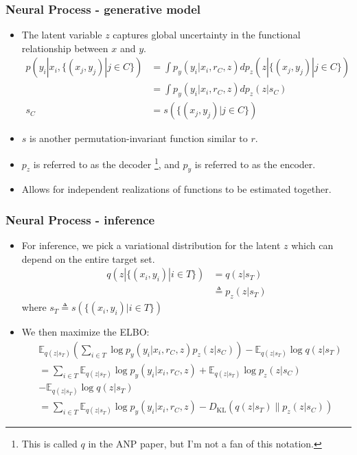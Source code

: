 \documentclass[t]{beamer}
\begin{document}
\begin{frame}
  \frametitle{Neural Process - generative model}
  \begin{itemize}
  \item The latent variable $z$ captures global uncertainty in the functional relationship between $x$ and $y$.
    \[
      \begin{split}
      p(y_i | x_i, \{(x_j, y_j) | j \in C\}) &= \int p_y(y_i | x_i, r_C, z) d p_z(z | \{(x_j, y_j) | j \in C\}) \\ 
      &= \int p_y(y_i | x_i, r_C, z) d p_z(z | s_C) \\
      s_C &= s( \{(x_j, y_j) | j \in C\}) 
    \end{split}
  \]
\item $s$ is another permutation-invariant function similar to $r$.
\item $p_z$ is referred to as the decoder \footnote{This is called $q$ in the ANP paper, but I'm not a fan of this notation.}, and $p_y$ is referred to as the encoder.
\item Allows for independent realizations of functions to be estimated together.
  \end{itemize}
\end{frame}


\begin{frame}
  \frametitle{Neural Process - inference}
  \begin{itemize}
  \item For inference, we pick a variational distribution for the latent $z$ which can depend on the entire target set.
    \[
      \begin{split}
      q(z | \{(x_i, y_i) | i \in  T\}) &= q(z | s_T) \\
                                        &\triangleq p_z(z | s_T)
                                      \end{split}
      \] where $s_T \triangleq s(\{(x_i, y_i) | i \in T\})$
  \item We then maximize the ELBO:
    \[
      \begin{split}
        &\mathbb E_{q(z | s_T)} (\sum_{i \in T} \log p_y(y_i | x_i, r_C, z) p_z(z | s_C)) - \mathbb E_{q(z | s_T)} \log q(z | s_T)\\
        &= \sum_{i \in T} \mathbb E_{q(z | s_T)} \log p_y(y_i | x_i, r_C, z) + \mathbb E_{q(z|s_T)} \log p_z(z|s_C) \\
        &-  \mathbb E_{q(z | s_T)} \log q(z | s_T)\\
        &= \sum_{i \in T} \mathbb E_{q(z | s_T)} \log p_y(y_i | x_i, r_C, z) - D_{\mathrm{KL}} (q(z|s_T) \| p_z(z | s_C)) 
   \end{split}
    \]
                                    
  \end{itemize}
 \end{frame}
\end{document}
